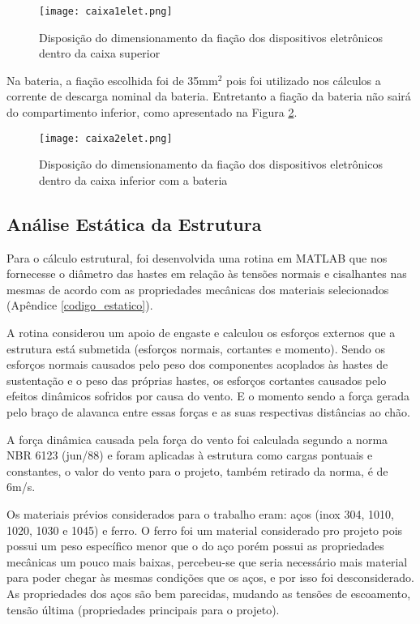 \begin{figure}[h]
	\centering
    \texttt{[image: caixa1elet.png]}
    \caption{Disposição do dimensionamento da fiação dos dispositivos eletrônicos dentro da caixa superior}
    \label{caixa1elet}
\end{figure}


 Na bateria, a fiação escolhida foi de 35mm$^2$ pois foi utilizado nos cálculos a corrente de descarga nominal da bateria. Entretanto a fiação da bateria não sairá do compartimento inferior, como apresentado na Figura \ref{caixa2elet}.

\begin{figure}[h]
	\centering
    \texttt{[image: caixa2elet.png]}
    \caption{Disposição do dimensionamento da fiação dos dispositivos eletrônicos dentro da caixa inferior com a bateria}
    \label{caixa2elet}
\end{figure}



\subsection{Análise Estática da Estrutura}

Para o cálculo estrutural, foi desenvolvida uma rotina em MATLAB que nos fornecesse o diâmetro das hastes em relação às tensões normais e cisalhantes nas mesmas de acordo com as propriedades mecânicas dos materiais selecionados (Apêndice \ref{codigo_estatico}).

A rotina considerou um apoio de engaste e calculou os esforços externos que a estrutura está submetida (esforços normais, cortantes e momento). Sendo os esforços normais causados pelo peso dos componentes acoplados às hastes de sustentação e o peso das próprias hastes, os esforços cortantes causados pelo efeitos dinâmicos sofridos por causa do vento. E o momento sendo a força gerada pelo braço de alavanca entre essas forças e as suas respectivas distâncias ao chão.

A força dinâmica causada pela força do vento foi calculada segundo a norma NBR 6123 (jun/88) \cite{vento} e foram aplicadas à estrutura como cargas pontuais e constantes, o valor do vento para o projeto, também retirado da norma, é de 6m/s.	

Os materiais prévios considerados para o trabalho eram: aços (inox 304, 1010, 1020, 1030 e 1045) e ferro. O ferro foi um material considerado pro projeto pois possui um peso específico menor que o do aço porém possui as propriedades mecânicas um pouco mais baixas, percebeu-se que seria necessário mais material para poder chegar às mesmas condições que os aços, e por isso foi desconsiderado. As propriedades dos aços são bem parecidas, mudando as tensões de escoamento, tensão última (propriedades principais para o projeto).
	

